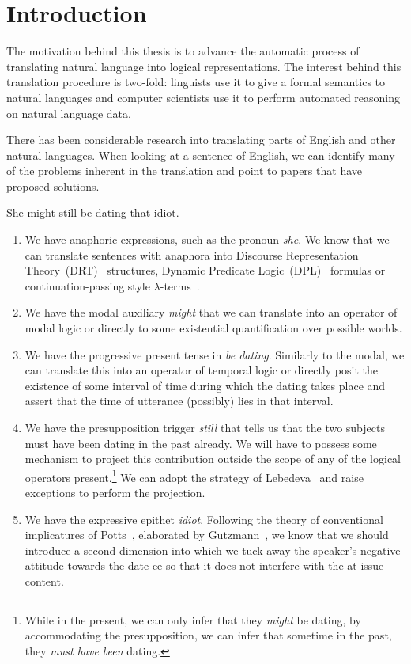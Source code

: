 \chapter*{Introduction}

The motivation behind this thesis is to advance the automatic process of
translating natural language into logical representations. The interest
behind this translation procedure is two-fold: linguists use it to give a
formal semantics to natural languages and computer scientists use it to
perform automated reasoning on natural language data.

There has been considerable research into translating parts of English and
other natural languages. When looking at a sentence of English, we can
identify many of the problems inherent in the translation and point to
papers that have proposed solutions.

\begin{exe}
  \ex She might still be dating that idiot. \label{ex:intro}
\end{exe}

\begin{enumerate}
\item \label{item:first-feature} We have anaphoric expressions, such as the
  pronoun \emph{she}. We know that we can translate sentences with anaphora
  into Discourse Representation Theory~(DRT)~\cite{kamp1993discourse}
  structures, Dynamic Predicate Logic~(DPL)~\cite{groenendijk1991dynamic}
  formulas or continuation-passing style
  $\lambda$-terms~\cite{de2006towards}.
  \item We have the modal auxiliary \emph{might} that we can translate into
    an operator of modal logic or directly to some existential
    quantification over possible worlds.
  \item We have the progressive present tense in \emph{be
      dating}. Similarly to the modal, we can translate this into an
    operator of temporal logic or directly posit the existence of some
    interval of time during which the dating takes place and assert that
    the time of utterance (possibly) lies in that interval.
  \item We have the presupposition trigger \emph{still} that tells us that
    the two subjects must have been dating in the past already. We will
    have to possess some mechanism to project this contribution outside the
    scope of any of the logical operators present.\footnote{While in the
      present, we can only infer that they \emph{might} be dating, by
      accommodating the presupposition, we can infer that sometime in the
      past, they \emph{must have been} dating.} We can adopt the strategy
    of Lebedeva~\cite{lebedeva2012expression} and raise exceptions to
    perform the projection.
  \item \label{item:last-feature} We have the expressive epithet
    \emph{idiot}. Following the theory of conventional implicatures of
    Potts~\cite{potts2005logic}, elaborated by
    Gutzmann~\cite{gutzmann2015use}, we know that we should introduce a
    second dimension into which we tuck away the speaker's negative
    attitude towards the date-ee so that it does not interfere with the
    at-issue content.
\end{enumerate}

